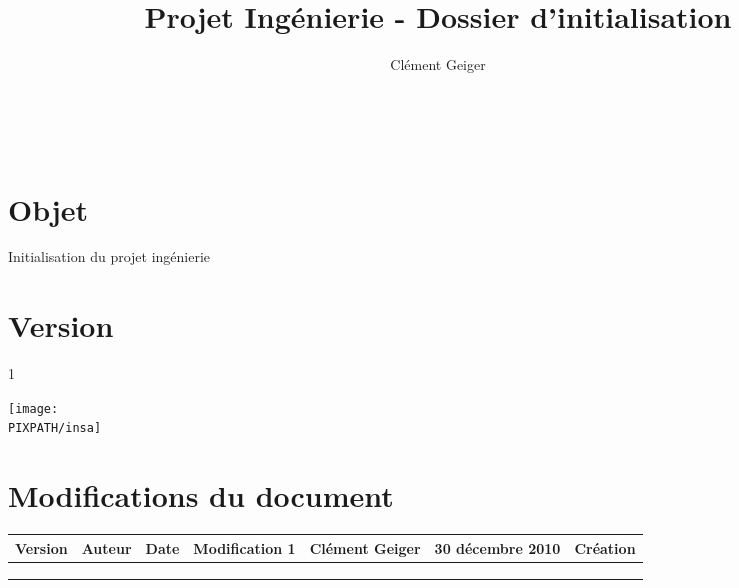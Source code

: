 \documentclass[twoside]{article}
\title{Projet Ingénierie - Dossier d'initialisation}
\author{Clément Geiger}
\newcommand\PIXPATH{./docs/pics}
\newcommand\Object{Initialisation du projet ingénierie}
\newcommand\Version{1}
\begin{document}



\maketitle

\thispagestyle{empty}

\hfill\\
\vfill

\section*{Objet}
\Object

\section*{Version}
\Version

\begin{center}
    \texttt{[image: \\PIXPATH/insa]}\hfill\\
\end{center}

\pagebreak



\section*{Modifications du document}

\begin{center}
\begin{longtable}{|m{14mm}||m{36mm}|m{36mm}|m{60mm}|}
\hline
Version & Auteur & Date & Modification\endhead \hline
1
& %
Clément Geiger
& %
30 décembre 2010
& %
Création
\\\hline

& %

& %

& %

\\\hline

& %

& %

& %

\\\hline

& %

& %

& %

\\\hline
\end{longtable}
\end{center}
\end{document}
